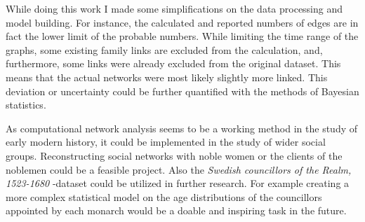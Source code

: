 While doing this work I made some simplifications on the data processing and model building. For instance, the calculated and reported numbers of edges are in fact the lower limit of the probable numbers. While limiting the time range of the graphs, some existing family links are excluded from the calculation, and, furthermore, some links were already excluded from the original dataset. This means that the actual networks were most likely slightly more linked. This deviation or uncertainty could be further quantified with the methods of Bayesian statistics.
 
As computational network analysis seems to be a working method in the study of early modern history, it could be implemented in the study of wider social groups. Reconstructing social networks with noble women or the clients of the noblemen could be a feasible project. Also the \textit{Swedish councillors of the Realm, 1523-1680} -dataset could be utilized in further research. For example creating a more complex statistical model on the age distributions of the councillors appointed by each monarch would be a doable and inspiring task in the future.

